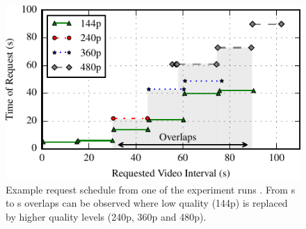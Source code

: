 \begin{figure}[t]
\centering
\includegraphics[width=0.9\linewidth]{figs/eg_request_schedule}%
\caption{Example request schedule from one of the experiment runs \cite{sieber16sacrificing}. From \unit[30]{s} to \unit[90]{s} overlaps can be observed where low quality (144p) is replaced by higher quality levels (240p, 360p and 480p).}
\label{fig:request_schedule}%
\end{figure}